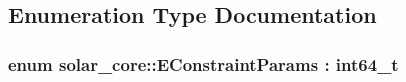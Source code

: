 \subsection{Enumeration Type Documentation}
\hypertarget{namespacesolar__core_ac827fdef4412a3c0d5e44d3f31908e49}{}
\subsubsection[{E\+Constraint\+Params}]{\setlength{\rightskip}{0pt plus 5cm}enum {\bf solar\+\_\+core\+::\+E\+Constraint\+Params} \+: int64\+\_\+t\hspace{0.3cm}{\ttfamily [strong]}}\label{namespacesolar__core_ac827fdef4412a3c0d5e44d3f31908e49}
